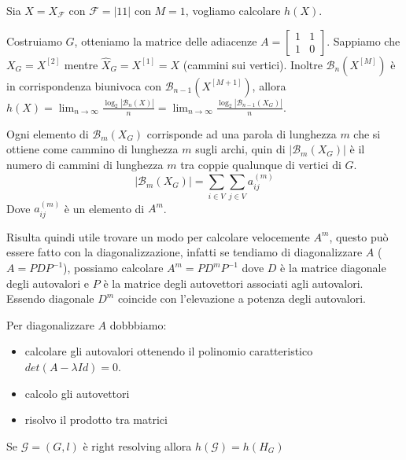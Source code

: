 \begin{esempio}
    Sia $X=X_\mathcal{F}$ con $\mathcal{F} = |{11}|$ con $M=1$, vogliamo calcolare 
    $h(X)$.

    Costruiamo $G$, otteniamo la matrice delle adiacenze $A=\left[\begin{array}{cc}
        1&1\\
        1&0
    \end{array}\right]$.
    Sappiamo che $X_G = X^{[2]}$ mentre $\hat{X}_G = X^{[1]} =X$ (cammini sui vertici).
    Inoltre $\mathcal{B}_n(X^{[M]})$ è in corrispondenza biunivoca con $\mathcal{B}_{n-1}(X^{[M+1]})$,
    allora $h(X)=\lim_{n\to \infty}\frac{\log_2|\mathcal{B}_n(X)|}{n} = \lim_{n\to \infty}\frac{\log_2|\mathcal{B}_{n-1}(X_G)|}{n}$.
\end{esempio}
Ogni elemento di $\mathcal{B}_{m}(X_G)$ corrisponde ad una parola di lunghezza 
$m$ che si ottiene come cammino di lunghezza $m$ sugli archi, quin di 
$|\mathcal{B}_{m}(X_G)|$ è il numero di cammini di lunghezza $m$ tra coppie qualunque
di vertici di $G$.
$$|\mathcal{B}_{m}(X_G)| = \sum_{i\in V}\sum_{j\in V} a_{ij}^{(m)}$$
Dove $a_{ij}^{(m)}$ è un elemento di $A^m$.

Risulta quindi utile trovare un modo per calcolare velocemente $A^m$, questo può
essere fatto con la diagonalizzazione, infatti se tendiamo di diagonalizzare $A$ ($A=PDP^{-1}$),
possiamo calcolare $A^m=PD^{m}P^{-1}$ dove $D$ è la matrice diagonale degli autovalori
e $P$ è la matrice degli autovettori associati agli autovalori. Essendo diagonale 
$D^m$ coincide con l'elevazione a potenza degli autovalori.

Per diagonalizzare $A$ dobbbiamo:
\begin{itemize}
    \item calcolare gli autovalori ottenendo il polinomio caratteristico $det(A-\lambda Id) =0$.
    \item calcolo gli autovettori
    \item risolvo il prodotto tra matrici
\end{itemize}

\begin{teorema}
    Se $\mathcal{G}= (G,l)$ è right resolving allora $h(\mathcal{G}) = h(H_G)$
\end{teorema}

